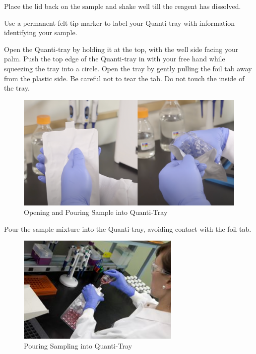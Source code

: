 \documentclass[12pt]{../SOP4_alpha}\usepackage[]{graphicx}\usepackage[]{xcolor}
\begin{document}
\NP Place the lid back on the sample and shake well till the reagent has dissolved.

\NP Use a permanent felt tip marker to label your Quanti-tray with information identifying your sample. 

\NP Open the Quanti-tray by holding it at the top, with the well side facing your palm. Push the top edge of the Quanti-tray in with your free hand while squeezing the tray into a circle. Open the tray by gently pulling the foil tab away from the plastic side. Be careful not to tear the tab. Do not touch the inside of the tray. 

\begin{figure}
\includegraphics[width=1\textwidth]{figures/OpeningQuanti-Tray.png}
\caption{Opening and Pouring Sample into Quanti-Tray}
\label{fig:Adding Reagent}
\end{figure}

\clearpage

\NP Pour the sample mixture into the Quanti-tray, avoiding contact with the foil tab.

\begin{figure}
\includegraphics[width=0.7\textwidth]{figures/Step2.jpg}
\caption{Pouring Sampling into Quanti-Tray}
\end{figure}
\end{document}
